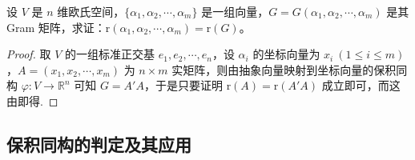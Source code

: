 \documentclass[../../main.tex]{subfiles}
\begin{document}
\begin{proposition}\label{proposition:Gram阵的秩与其生成向量的秩相同-例9.33}
设 \(V\) 是 \(n\) 维欧氏空间，\(\{\alpha_1,\alpha_2,\cdots,\alpha_m\}\) 是一组向量，\(G = G(\alpha_1,\alpha_2,\cdots,\alpha_m)\) 是其 Gram 矩阵，求证：\(\mathrm{r}(\alpha_1,\alpha_2,\cdots,\alpha_m)=\mathrm{r}(G)\)。
\end{proposition}
\begin{proof}
取 \(V\) 的一组标准正交基 \(e_1,e_2,\cdots,e_n\)，设 \(\alpha_i\) 的坐标向量为 \(x_i\ (1\leq i\leq m)\)，\(A=(x_1,x_2,\cdots,x_m)\) 为 \(n\times m\) 实矩阵，则由抽象向量映射到坐标向量的保积同构 \(\varphi:V\rightarrow\mathbb{R}^n\) 可知 \(G = A'A\)，于是只要证明 \(\mathrm{r}(A)=\mathrm{r}(A'A)\) 成立即可，而这由即得.
\end{proof}


\subsection{保积同构的判定及其应用}
\end{document}
